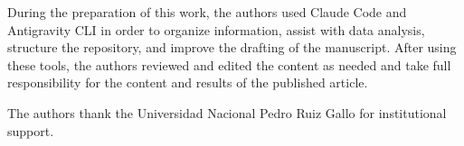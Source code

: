 \documentclass[twocolumn]{USG}
\begin{document}
During the preparation of this work, the authors used Claude Code and
Antigravity CLI in order to organize information, assist with data analysis,
structure the repository, and improve the drafting of the manuscript. After
using these tools, the authors reviewed and edited the content as needed and
take full responsibility for the content and results of the published
article.

The authors thank the Universidad Nacional Pedro Ruiz Gallo for institutional
support.



\end{document}

